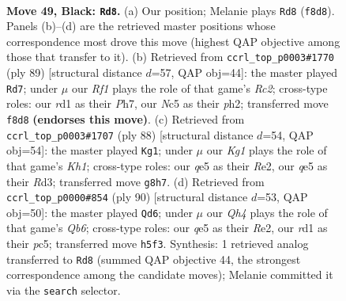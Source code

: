 \documentclass[11pt]{article}
\begin{document}
\clearpage

\begin{figure}[p]\centering
\begin{subfigure}{0.46\textwidth}\centering
\resizebox{\linewidth}{!}{%
\newchessgame
\chessboard[
  setfen={5rk1/p2P4/1p6/2n1Qp1q/P1p5/6P1/1P6/R2R2K1 b - - 0 49},
  showmover=false,
  pgfstyle=straightmove, color=movearrow, markmove={f8-d8}
]}
\caption{}
\end{subfigure}\hfill
\begin{subfigure}{0.46\textwidth}\centering
\resizebox{\linewidth}{!}{%
\newchessgame
\chessboard[
  setfen={2r5/2r3kp/3q2p1/pp1P4/7Q/5P2/6PP/3RR2K b - - 2 45},
  showmover=false,
  pgfstyle=straightmove, color=movearrow, markmove={c7-d7}
]}
\caption{}
\end{subfigure}
\\[4pt]
\begin{subfigure}{0.46\textwidth}\centering
\resizebox{\linewidth}{!}{%
\newchessgame
\chessboard[
  setfen={4r1k1/5p2/p3r3/2Q5/1P3q2/P2Rp2P/4R1P1/7K w - - 15 45},
  showmover=false,
  pgfstyle=straightmove, color=movearrow, markmove={h1-g1}
]}
\caption{}
\end{subfigure}\hfill
\begin{subfigure}{0.46\textwidth}\centering
\resizebox{\linewidth}{!}{%
\newchessgame
\chessboard[
  setfen={4r1k1/7p/1Q3R2/2pPr3/6Pq/1P2p2P/4R1K1/8 w - - 6 46},
  showmover=false,
  pgfstyle=straightmove, color=movearrow, markmove={b6-d6}
]}
\caption{}
\end{subfigure}
\caption{\textbf{Move 49, Black: \texttt{Rd8}.} (a) Our position; Melanie plays \texttt{Rd8} (\texttt{f8d8}). Panels (b)--(d) are the retrieved master positions whose correspondence most drove this move (highest QAP objective among those that transfer to it). (b) Retrieved from \texttt{ccrl\_top\_p0003\#1770} (ply 89) [structural distance $d$=57, QAP obj=44]: the master played \texttt{Rd7}; under $\mu$ our \emph{Rf1} plays the role of that game's \emph{Rc2}; cross-type roles: our \emph{r}d1 as their \emph{P}h7, our \emph{N}c5 as their \emph{p}h2; transferred move \texttt{f8d8} \textbf{(endorses this move)}. (c) Retrieved from \texttt{ccrl\_top\_p0003\#1707} (ply 88) [structural distance $d$=54, QAP obj=54]: the master played \texttt{Kg1}; under $\mu$ our \emph{Kg1} plays the role of that game's \emph{Kh1}; cross-type roles: our \emph{q}e5 as their \emph{R}e2, our \emph{q}e5 as their \emph{R}d3; transferred move \texttt{g8h7}. (d) Retrieved from \texttt{ccrl\_top\_p0000\#854} (ply 90) [structural distance $d$=53, QAP obj=50]: the master played \texttt{Qd6}; under $\mu$ our \emph{Qh4} plays the role of that game's \emph{Qb6}; cross-type roles: our \emph{q}e5 as their \emph{R}e2, our \emph{r}d1 as their \emph{p}c5; transferred move \texttt{h5f3}. Synthesis: 1 retrieved analog transferred to \texttt{Rd8} (summed QAP objective 44, the strongest correspondence among the candidate moves); Melanie committed it via the \texttt{search} selector.}
\label{fig:thought-m97}
\end{figure}
\end{document}
